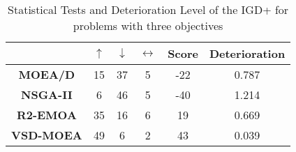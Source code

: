 \begin{table}[t]
\centering
\caption{Statistical Tests and Deterioration Level of the IGD+ for problems with three objectives}
\label{tab:Tests_IGDP_3obj}
\begin{scriptsize}
\begin{tabular}{c c|c|c|c|c}
\cline{2-6}
                                        & \textbf{$\uparrow$} & \textbf{$\downarrow$} & \textbf{$\leftrightarrow$} & \textbf{Score} & \textbf{Deterioration} \\ \hline
\multicolumn{1}{c|}{\textbf{MOEA/D}}   & 15                  & 37                     & 5                          & -22                          & 0.787         \\ \hline
\multicolumn{1}{c|}{\textbf{NSGA-II}}  & 6                   & 46                     & 5                          & -40                          & 1.214         \\ \hline
\multicolumn{1}{c|}{\textbf{R2-EMOA}}  & 35                  & 16                     & 6                          & 19                          & 0.669         \\ \hline
\multicolumn{1}{c|}{\textbf{VSD-MOEA}} & 49                  & 6                      & 2                          & 43                          & 0.039         \\ \hline
\end{tabular}%
\end{scriptsize}
\end{table}

